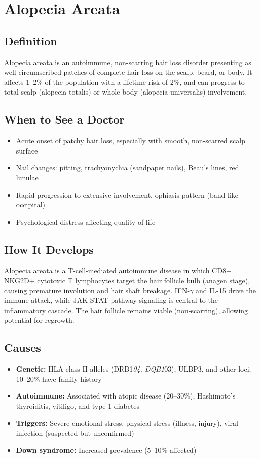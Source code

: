 \chapter{Alopecia Areata}

\section*{Definition}
Alopecia areata is an autoimmune, non-scarring hair loss disorder presenting as well-circumscribed patches of complete hair loss on the scalp, beard, or body. It affects 1--2\% of the population with a lifetime risk of 2\%, and can progress to total scalp (alopecia totalis) or whole-body (alopecia universalis) involvement.

\section*{When to See a Doctor}

\begin{itemize}
 \item Acute onset of patchy hair loss, especially with smooth, non-scarred scalp surface
 \item Nail changes: pitting, trachyonychia (sandpaper nails), Beau's lines, red lunulae
 \item Rapid progression to extensive involvement, ophiasis pattern (band-like occipital)
 \item Psychological distress affecting quality of life
\end{itemize}

\section*{How It Develops}
Alopecia areata is a T-cell-mediated autoimmune disease in which CD8+ NKG2D+ cytotoxic T lymphocytes target the hair follicle bulb (anagen stage), causing premature involution and hair shaft breakage. IFN-\ensuremath{\gamma} and IL-15 drive the immune attack, while JAK-STAT pathway signaling is central to the inflammatory cascade. The hair follicle remains viable (non-scarring), allowing potential for regrowth.

\section*{Causes}
\begin{itemize}
 \item \textbf{Genetic:} HLA class II alleles (DRB1\textit{04, DQB1}03), ULBP3, and other loci; 10--20\% have family history
 \item \textbf{Autoimmune:} Associated with atopic disease (20--30\%), Hashimoto's thyroiditis, vitiligo, and type 1 diabetes
 \item \textbf{Triggers:} Severe emotional stress, physical stress (illness, injury), viral infection (suspected but unconfirmed)
 \item \textbf{Down syndrome:} Increased prevalence (5--10\% affected)
\end{itemize}

